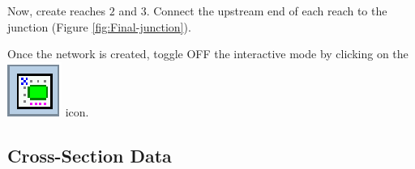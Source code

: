\documentclass[a4paper,12pt]{article}
\begin{document}
\vspace{0.5cm}

Now, create reaches $2$ and $3$. Connect the upstream end of each reach to the junction (Figure \ref{fig:Final-junction}).

\vspace{0.5cm}

Once the network is created, toggle OFF the interactive mode by clicking
on the \includegraphics[scale=0.6]{edit_nw} icon.


\subsection{Cross-Section Data  }
\end{document}
